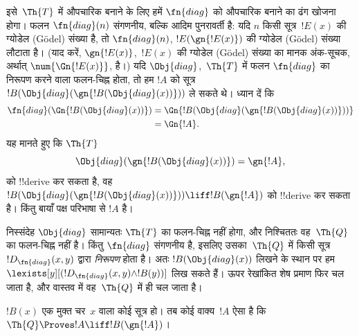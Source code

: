 \documentclass[../../../include/open-logic-section]{subfiles}
\begin{document}
\begin{explain}
इसे~$\Th{T}$ में औपचारिक बनाने के लिए हमें $\fn{diag}$ को औपचारिक बनाने
का ढंग खोजना होगा। फलन $\fn{diag}(n)$ संगणनीय, बल्कि आदिम पुनरावर्ती है:
यदि $n$ किसी सूत्र~$!E(x)$ की ग्योडेल (G\"odel) संख्या है, तो $\fn{diag}(n)$,
$!E(\gn{!E(x)})$ की ग्योडेल (G\"odel) संख्या लौटाता है। (याद करें,
$\gn{!E(x)}$,~$!E(x)$ की ग्योडेल (G\"odel) संख्या का मानक अंक-सूचक, अर्थात्
$\num{\Gn{!E(x)}}$, है।) यदि $\Obj{diag}$,~$\Th{T}$ में फलन
$\fn{diag}$ का निरूपण करने वाला फलन-चिह्न होता, तो हम $!A$ को सूत्र
$!B(\Obj{diag}(\gn{!B(\Obj{diag}(x))}))$ ले सकते थे। ध्यान दें कि
\begin{align*}
\fn{diag}(\Gn{!B(\Obj{diag}(x))}) & =
\Gn{!B(\Obj{diag}(\gn{!B(\Obj{diag}(x))}))} \\
& = \Gn{!A}.
\end{align*}
यह मानते हुए कि $\Th{T}$
\[
\Obj{diag}(\gn{!B(\Obj{diag}(x))}) = \gn{!A},
\]
को !!{derive} कर सकता है, वह
$!B(\Obj{diag}(\gn{!B(\Obj{diag}(x))}))
\liff !B(\gn{!A})$ को !!{derive} कर सकता है। किंतु बायाँ पक्ष परिभाषा से
$!A$ है।

निस्संदेह $\Obj{diag}$ सामान्यतः $\Th{T}$ का फलन-चिह्न नहीं होगा, और
निश्चिततः वह~$\Th{Q}$ का फलन-चिह्न नहीं है। किंतु $\fn{diag}$ संगणनीय है,
इसलिए उसका~$\Th{Q}$ में किसी सूत्र $!D_{\fn{diag}}(x,y)$ द्वारा
\emph{निरूपण} होता है। अतः $!B(\Obj{diag}(x))$ लिखने के स्थान पर हम
$\lexists[y][(!D_{\fn{diag}}(x,y) \land !B(y))]$ लिख सकते हैं। ऊपर
रेखांकित शेष प्रमाण फिर चल जाता है, और वास्तव में वह~$\Th{Q}$ में ही चल
जाता है।
\end{explain}

\begin{lem}
 $!B(x)$ एक मुक्त चर~$x$ वाला कोई सूत्र हो। तब
कोई वाक्य~$!A$ ऐसा है कि $\Th{Q} \Proves !A \liff !B(\gn{!A})$।
\end{lem}
\end{document}
